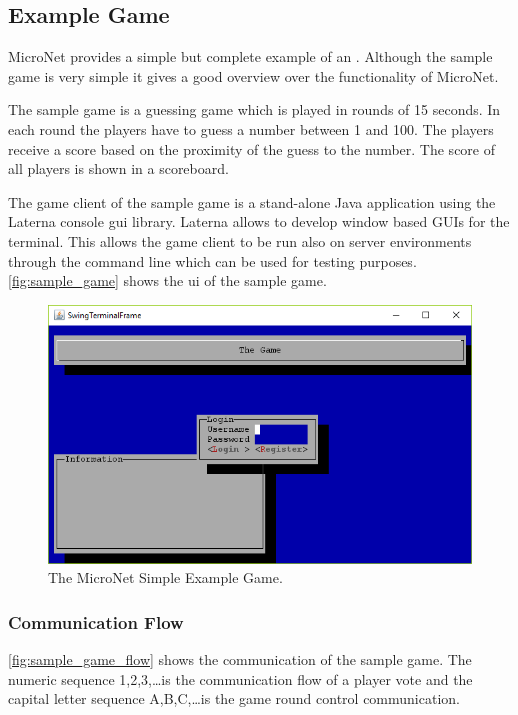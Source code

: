 \subsection{Example Game}
\label{sub:example_game}

MicroNet provides a simple but complete example of an \og{}. Although the sample
game is very simple it gives a good overview over the functionality of MicroNet.

The sample game is a guessing game which is played in rounds of 15 seconds.
In each round the players have to guess a number between 1 and 100. The players
receive a score based on the proximity of the guess to the number. The score of
all players is shown in a scoreboard. 

The game client of the sample game is a stand-alone Java application using the
Laterna console gui library. Laterna allows to develop window based GUIs for the
terminal. This allows the game client to be run also on server environments
through the command line which can be used for testing purposes.
\autoref{fig:sample_game} shows the \gls{ui} of the sample game.

\begin{figure}
	\centering
	\includegraphics[width=\textwidth]{images/SampleGame}
	\caption{The MicroNet Simple Example Game.}
	\label{fig:sample_game}
\end{figure}

\subsubsection{Communication Flow}

\autoref{fig:sample_game_flow} shows the communication of the sample game. The
numeric sequence 1,2,3,\ldots is the communication flow of a player vote and the
capital letter sequence A,B,C,\ldots is the game round control communication.\\

